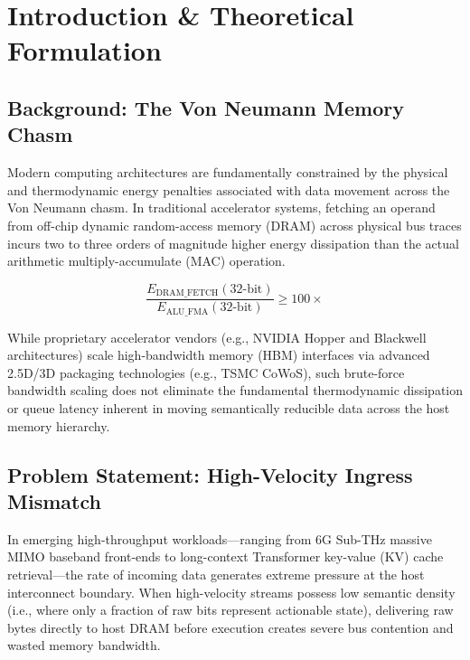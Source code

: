 \chapter{Introduction \& Theoretical Formulation}
\label{chap:intro}

\section{Background: The Von Neumann Memory Chasm}
Modern computing architectures are fundamentally constrained by the physical and thermodynamic energy penalties associated with data movement across the Von Neumann chasm. In traditional accelerator systems, fetching an operand from off-chip dynamic random-access memory (DRAM) across physical bus traces incurs two to three orders of magnitude higher energy dissipation than the actual arithmetic multiply-accumulate (MAC) operation.

$$\frac{E_{\text{DRAM\_FETCH}}(32\text{-bit})}{E_{\text{ALU\_FMA}}(32\text{-bit})} \ge 100\times$$

While proprietary accelerator vendors (e.g., NVIDIA Hopper and Blackwell architectures) scale high-bandwidth memory (HBM) interfaces via advanced 2.5D/3D packaging technologies (e.g., TSMC CoWoS), such brute-force bandwidth scaling does not eliminate the fundamental thermodynamic dissipation or queue latency inherent in moving semantically reducible data across the host memory hierarchy.

\section{Problem Statement: High-Velocity Ingress Mismatch}
In emerging high-throughput workloads---ranging from 6G Sub-THz massive MIMO baseband front-ends to long-context Transformer key-value (KV) cache retrieval---the rate of incoming data generates extreme pressure at the host interconnect boundary. When high-velocity streams possess low semantic density (i.e., where only a fraction of raw bits represent actionable state), delivering raw bytes directly to host DRAM before execution creates severe bus contention and wasted memory bandwidth.

